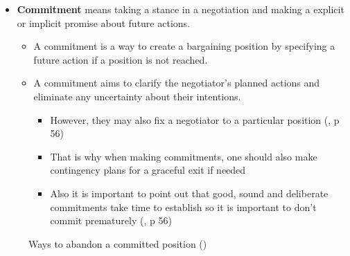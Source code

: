 \documentclass[
  ignorenonframetext,
]{beamer}
\begin{document}
\begin{frame}{}
\label{section-13}
\begin{itemize}
\item
  \textbf{Commitment} means taking a stance in a negotiation and making
  a explicit or implicit promise about future actions.

  \begin{itemize}
  \item
    A commitment is a way to create a bargaining position by specifying
    a future action if a position is not reached.
  \item
    A commitment aims to clarify the negotiator's planned actions and
    eliminate any uncertainty about their intentions.

    \begin{itemize}
    \item
      However, they may also fix a negotiator to a particular position
      (, p 56)
    \item
      That is why when making commitments, one should also make
      contingency plans for a graceful exit if needed
    \item
      Also it is important to point out that good, sound and deliberate
      commitments take time to establish so it is important to don't
      commit prematurely
      (, p 56)
    \end{itemize}
  \end{itemize}
\end{itemize}
\end{frame}

\begin{frame}{}
\label{section-14}
\begin{figure}


\caption{\label{fig-ways-to-abandon-committed-position}Ways to abandon a
committed position ()}

\end{figure}%
\end{frame}
\end{document}
